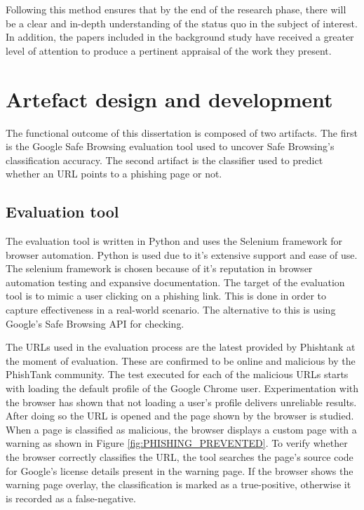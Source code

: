 Following this method ensures that by the end of the research phase, there will be a clear and in-depth understanding of the status quo in the subject of interest. In addition, the papers included in the background study have received a greater level of attention to produce a pertinent appraisal of the work they present.


\section{Artefact design and development}
The functional outcome of this dissertation is composed of two artifacts. The first is the Google Safe Browsing evaluation tool used to uncover Safe Browsing's classification accuracy. The second artifact is the classifier used to predict whether an URL points to a phishing page or not.

\subsection{Evaluation tool}
The evaluation tool is written in Python and uses the Selenium framework for browser automation. Python is used due to it's extensive support and ease of use. The selenium framework is chosen because of it's reputation in browser automation testing and expansive documentation. The target of the evaluation tool is to mimic a user clicking on a phishing link. This is done in order to capture effectiveness in a real-world scenario. The alternative to this is using Google's Safe Browsing API for checking.

The URLs used in the evaluation process are the latest provided by Phishtank at the moment of evaluation. These are confirmed to be online and malicious by the PhishTank community. The test executed for each of the malicious URLs starts with loading the default profile of the Google Chrome user. Experimentation with the browser has shown that not loading a user's profile delivers unreliable results. After doing so the URL is opened and the page shown by the browser is studied. When a page is classified as malicious, the browser displays a custom page with a warning as shown in Figure \ref{fig:PHISHING_PREVENTED}. To verify whether the browser correctly classifies the URL, the tool searches the page's source code for Google's license details present in the warning page. If the browser shows the warning page overlay, the classification is marked as a true-positive, otherwise it is recorded as a false-negative.


